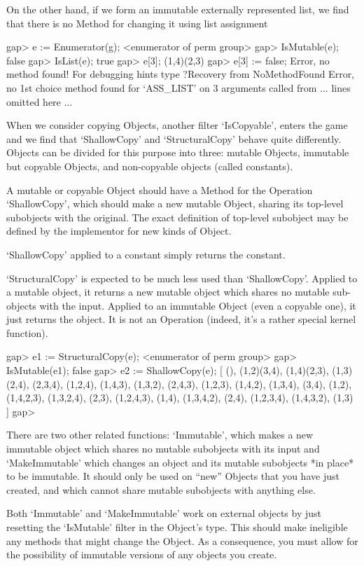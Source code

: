 On the other hand, if we form an immutable externally represented list, we
find that there is no Method for changing it using list assignment

\beginexample
gap> e := Enumerator(g);
<enumerator of perm group>
gap> IsMutable(e);
false
gap> IsList(e);
true
gap> e[3];
(1,4)(2,3)
gap> e[3] := false;
Error, no method found! For debugging hints type ?Recovery from NoMethodFound
Error, no 1st choice method found for `ASS_LIST' on 3 arguments called from
... lines omitted here ...
\endexample

When we consider copying Objects, another filter `IsCopyable', enters
the game and we find that `ShallowCopy' and `StructuralCopy' behave quite
differently. Objects can be divided for this purpose into three:
mutable Objects, immutable but copyable Objects, and non-copyable
objects (called constants).

A mutable or copyable  Object should have a Method for the Operation
`ShallowCopy', which should make a new mutable Object, sharing its top-level
subobjects with the original. The exact definition of top-level subobject may
be defined by the implementor for new kinds of Object.

`ShallowCopy' applied to a constant simply returns the constant.

`StructuralCopy' is expected to be much less used than
`ShallowCopy'. Applied to a mutable object, it returns a new mutable
object which shares no mutable sub-objects with the input. Applied to
an immutable Object (even a copyable one), it just returns the
object. It is not an Operation (indeed, it's a rather special kernel
function).

\beginexample
gap> e1 := StructuralCopy(e);
<enumerator of perm group>
gap> IsMutable(e1);
false
gap> e2 := ShallowCopy(e);
[ (), (1,2)(3,4), (1,4)(2,3), (1,3)(2,4), (2,3,4), (1,2,4), (1,4,3), (1,3,2), 
  (2,4,3), (1,2,3), (1,4,2), (1,3,4), (3,4), (1,2), (1,4,2,3), (1,3,2,4), 
  (2,3), (1,2,4,3), (1,4), (1,3,4,2), (2,4), (1,2,3,4), (1,4,3,2), (1,3) ]
gap> 
\endexample

There are two other related functions: `Immutable', which makes a new
immutable object which shares no mutable subobjects with its input and
`MakeImmutable' which changes an object and its mutable subobjects *in
place* to be immutable. It should only be used on ``new'' Objects that
you have just created, and which cannot share mutable subobjects with
anything else.

Both `Immutable' and `MakeImmutable' work on external objects by just
resetting the `IsMutable' filter in the Object's type. This should make
ineligible any methods that might change the Object. As a consequence,
you must allow for the possibility of immutable versions of any
objects you create.

